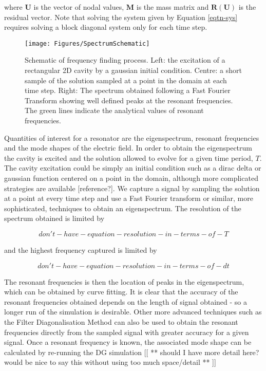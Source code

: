 \documentclass[times,11pt]{ACME2015article}
\newcommand{\mb}[1]{\boldsymbol{#1}}
\begin{document}
\begin{normalsize}
where $\mb{U}$ is the vector of nodal values, $\mb{M}$ is the mass matrix and $\mb{R}(\mb{U})$ is the residual vector. Note that solving the system given by Equation \ref{eqtn-sys} requires solving a block diagonal system only for each time step. 


\begin{figure}[htbp!]
 \centering
 \texttt{[image: Figures/SpectrumSchematic]}
 \caption{Schematic of frequency finding process. Left: the excitation of a rectangular 2D cavity by a gaussian initial condition. Centre: a short sample of the solution sampled at a point in the domain at each time step. Right: The spectrum obtained following a Fast Fourier Transform showing well defined peaks at the resonant frequencies. The green lines indicate the analytical values of resonant frequencies. }
 \label{frequency_schematic}
\end{figure}

Quantities of interest for a resonator are the eigenspectrum, resonant frequencies and the mode shapes of the electric field. In order to obtain the eigenspectrum the cavity is excited and the solution allowed to evolve for a given time period, $T$. The cavity excitation could be simply an initial condition such as a dirac delta or gaussian function centered on a point in the domain, although more complicated strategies are available [reference?]. We capture a signal by sampling the solution at a point at every time step and use a Fast Fourier transform or similar, more sophisticated, techniques to obtain an eigenspectrum. The resolution of the spectrum obtained is limited by

\begin{equation}\label{spec-resolution-eqtn}
don't - have - equation - resolution - in - terms - of - T
\end{equation}

and the highest frequency captured is limited by

\begin{equation}
don't - have - equation - resolution - in - terms - of - dt
\end{equation}

The resonant frequencies is then the location of peaks in the eigenspectrum, which can be obtained by curve fitting. It is clear that the accuracy of the resonant frequencies obtained depends on the length of signal obtained - so a longer run of the simulation is desirable. Other more advanced techniques such as the Filter Diagonalisation Method can also be used to obtain the resonant frequencies directly from the sampled signal with greater accuracy for a given signal. Once a resonant frequency is known, the associated mode shape can be calculated by re-running the DG simulation [[ ** should I have more detail here? would be nice to say this without using too much space/detail ** ]]


\end{normalsize}
\end{document}
